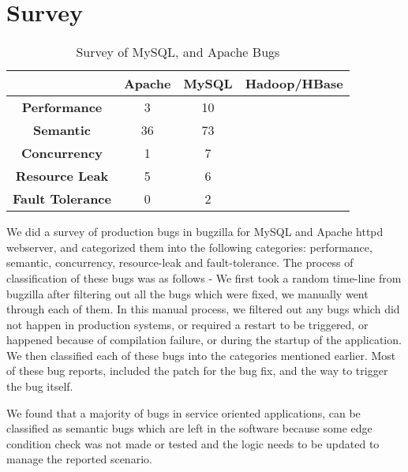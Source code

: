 \section{Survey}
\label{sec:survey}

\begin{table}[]
	\centering
	\begin{tabular}{@{}|c|c|c|c|@{}}
		\toprule
		& \textbf{Apache} & \textbf{MySQL} & \textbf{Hadoop/HBase} \\ \midrule
		\textbf{Performance} & 3 & 10 &  \\ \midrule
		\textbf{Semantic} & 36 & 73 &  \\ \midrule
		\textbf{Concurrency} & 1 & 7 &  \\ \midrule
		\textbf{Resource Leak} & 5 & 6 &  \\ \midrule
		\textbf{Fault Tolerance} & 0 & 2 &  \\ \bottomrule
	\end{tabular}
	\caption{Survey of MySQL, and Apache Bugs}
	\label{tab:survey}
\end{table}

We did a survey of production bugs in bugzilla for MySQL and Apache httpd webserver, and categorized them into the following categories: performance, semantic, concurrency, resource-leak and fault-tolerance. 
The process of classification of these bugs was as follows - We first took a random time-line from bugzilla after filtering out all the bugs which were fixed, we manually went through each of them. 
In this manual process, we filtered out any bugs which did not happen in production systems, or required a restart to be triggered, or happened because of compilation failure, or during the startup of the application. 
We then classified each of these bugs into the categories mentioned earlier.
Most of these bug reports, included the patch for the bug fix, and the way to trigger the bug itself. 

We found that a majority of bugs in service oriented applications, can be classified as semantic bugs which are left in the software because some edge condition check was not made or tested and the logic needs to be updated to manage the reported scenario.